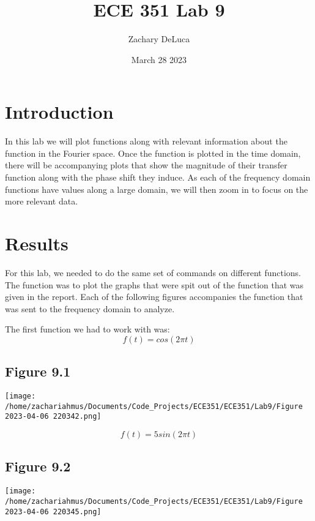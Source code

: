 \documentclass[12pt,a4paper]{article}
\title{ECE 351 Lab 9}
\author{Zachary DeLuca}
\date{March 28 2023}
\begin{document}
	
\maketitle
\hline
\section*{Introduction}
	In this lab we will plot functions along with relevant information about the function in the Fourier space. Once the function is plotted in the time domain, there will be accompanying plots that show the magnitude of their transfer function along with the phase shift they induce. As each of the frequency domain functions have values along a large domain, we will then zoom in to focus on the more relevant data. 

\section*{Results}
For this lab, we needed to do the same set of commands on different functions. The function was to plot the graphs that were spit out of the function that was given in the report. Each of the following figures accompanies the function that was sent to the frequency domain to analyze. \vspace*{12pt}

The first function we had to work with was: 
$$f(t)=cos(2\pi t)$$
\begin{center}
	\subsection*{Figure 9.1}
	\texttt{[image: /home/zachariahmus/Documents/Code\_Projects/ECE351/ECE351/Lab9/Figure 2023-04-06 220342.png]}
\end{center}
\vspace*{12pt}

$$f(t)=5sin(2\pi t)$$
\begin{center}
	\subsection*{Figure 9.2}
	\texttt{[image: /home/zachariahmus/Documents/Code\_Projects/ECE351/ECE351/Lab9/Figure 2023-04-06 220345.png]}
\end{center}
\end{document}
